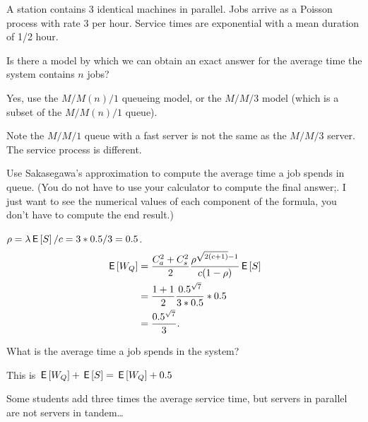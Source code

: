 A station contains 3 identical machines in parallel. Jobs arrive as a Poisson process with rate $3$ per hour. Service times are exponential with a mean duration of 1/2 hour. 

\begin{exercise}[201807]{1}
  Is there a model by which we can obtain an exact answer for the average time the system contains $n$ jobs? 
\begin{solution}
    Yes, use the $M/M(n)/1$ queueing model, or the $M/M/3$ model (which is a subset of the $M/M(n)/1$ queue). 

Note the $M/M/1$ queue with a fast server is not the same as the $M/M/3$ server. The service process is different. 
\end{solution}
\end{exercise}


\begin{exercise}[201807]{1}
Use Sakasegawa's approximation to compute the average time a job spends in queue. (You do not have to use your calculator to compute the final answer;. I just want to see the numerical values of each component of the formula, you don't have to compute the end result.)
\begin{solution}
$\rho = \lambda \,\mathsf{E}\left[S\right]/c = 3 *0.5/3=0.5$.
\begin{align*}
  \,\mathsf{E}\left[W_Q\right] 
&= \frac{C_a^2+C_s^2}2 \frac{\rho^{\sqrt{2(c+1)}-1}}{c(1-\rho)} \,\mathsf{E}\left[S\right] \\
&= \frac{1+1}2 \frac{0.5^{\sqrt{7}}}{3*0.5} *0.5 \\
&=\frac{0.5^{\sqrt{7}}}{3}. 
\end{align*}
\end{solution}
\end{exercise}


\begin{exercise}[201807]{1}
  What is the average time a job spends in the system?
\begin{solution}
    This is $\,\mathsf{E}\left[W_Q\right] + \,\mathsf{E}\left[S\right] = \,\mathsf{E}\left[W_Q\right] + 0.5$
\end{solution}

Some students add three times the average service time, but servers in parallel are not servers in tandem\ldots
\end{exercise}


